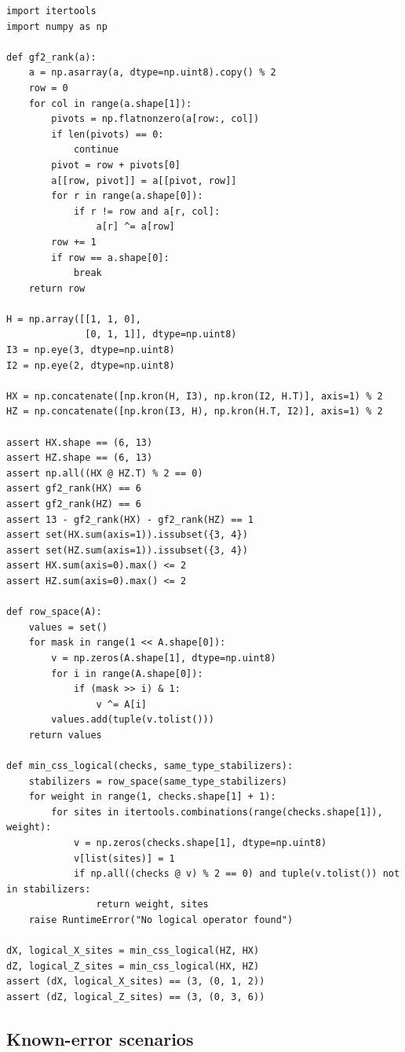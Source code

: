 \documentclass[11pt]{article}
\begin{document}
\begin{lstlisting}[style=python]
import itertools
import numpy as np

def gf2_rank(a):
    a = np.asarray(a, dtype=np.uint8).copy() % 2
    row = 0
    for col in range(a.shape[1]):
        pivots = np.flatnonzero(a[row:, col])
        if len(pivots) == 0:
            continue
        pivot = row + pivots[0]
        a[[row, pivot]] = a[[pivot, row]]
        for r in range(a.shape[0]):
            if r != row and a[r, col]:
                a[r] ^= a[row]
        row += 1
        if row == a.shape[0]:
            break
    return row

H = np.array([[1, 1, 0],
              [0, 1, 1]], dtype=np.uint8)
I3 = np.eye(3, dtype=np.uint8)
I2 = np.eye(2, dtype=np.uint8)

HX = np.concatenate([np.kron(H, I3), np.kron(I2, H.T)], axis=1) % 2
HZ = np.concatenate([np.kron(I3, H), np.kron(H.T, I2)], axis=1) % 2

assert HX.shape == (6, 13)
assert HZ.shape == (6, 13)
assert np.all((HX @ HZ.T) % 2 == 0)
assert gf2_rank(HX) == 6
assert gf2_rank(HZ) == 6
assert 13 - gf2_rank(HX) - gf2_rank(HZ) == 1
assert set(HX.sum(axis=1)).issubset({3, 4})
assert set(HZ.sum(axis=1)).issubset({3, 4})
assert HX.sum(axis=0).max() <= 2
assert HZ.sum(axis=0).max() <= 2

def row_space(A):
    values = set()
    for mask in range(1 << A.shape[0]):
        v = np.zeros(A.shape[1], dtype=np.uint8)
        for i in range(A.shape[0]):
            if (mask >> i) & 1:
                v ^= A[i]
        values.add(tuple(v.tolist()))
    return values

def min_css_logical(checks, same_type_stabilizers):
    stabilizers = row_space(same_type_stabilizers)
    for weight in range(1, checks.shape[1] + 1):
        for sites in itertools.combinations(range(checks.shape[1]), weight):
            v = np.zeros(checks.shape[1], dtype=np.uint8)
            v[list(sites)] = 1
            if np.all((checks @ v) % 2 == 0) and tuple(v.tolist()) not in stabilizers:
                return weight, sites
    raise RuntimeError("No logical operator found")

dX, logical_X_sites = min_css_logical(HZ, HX)
dZ, logical_Z_sites = min_css_logical(HX, HZ)
assert (dX, logical_X_sites) == (3, (0, 1, 2))
assert (dZ, logical_Z_sites) == (3, (0, 3, 6))
\end{lstlisting}

\subsection{Known-error scenarios}
\end{document}
